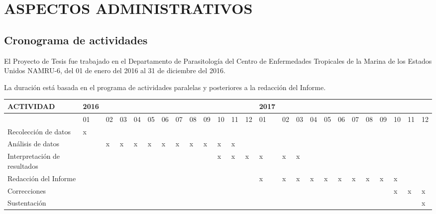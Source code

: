 \documentclass[]{article}
\begin{document}
\section{ASPECTOS ADMINISTRATIVOS}\label{aspectos-administrativos}

\subsection{Cronograma de actividades}\label{cronograma-de-actividades}

El Proyecto de Tesis fue trabajado en el Departamento de Parasitología
del Centro de Enfermedades Tropicales de la Marina de los Estados Unidos
NAMRU-6, del 01 de enero del 2016 al 31 de diciembre del 2016.

La duración está basada en el programa de actividades paralelas y
posteriores a la redacción del Informe.

\begin{table}[ht]
\begin{center}
\hspace*{-1cm}
\begin{tabular}{lp{1mm}p{1mm}p{1mm}p{1mm}p{1mm}p{1mm}
p{1mm}p{1mm}p{1mm}p{1mm}p{1mm}p{1mm}p{1mm}p{1mm}p{1mm}
p{1mm}p{1mm}p{1mm}p{1mm}p{1mm}p{1mm}p{1mm}p{1mm}p{1mm}}
  \hline
  \textbf{ACTIVIDAD} & 
  \textbf{2016} & & & & & & & & & & & & 
  \textbf{2017} & & & & & & & & & & &\\
  \hline
  & 
  01 & 02 & 03 & 04 & 05 & 06 & 07 & 08 & 09 & 10 & 11 & 12 & 
  01 & 02 & 03 & 04 & 05 & 06 & 07 & 08 & 09 & 10 & 11 & 12\\
  \hline
  Recolección de datos & 
  x & & & & & & & & & & & & 
  & & & & & & & & & & &\\
  \cline{2-25}
  Análisis de datos & 
  & x & x & x & x & x & x & x & x & x & x & & 
  & & & & & & & & & & &\\
  \cline{2-25}
  Interpretación de resultados & 
  & & & & & & & & & x & x & x &
  x & x & x & & & & & & & & &\\
  \cline{2-25}
  Redacción del Informe & 
  & & & & & & & & & & & & 
  x & x & x & x & x & x & x & x & x & x & &\\
  \cline{2-25}
  Correcciones & 
  & & & & & & & & & & & & 
  & & & & & & & & & x & x & x\\
  \cline{2-25}
  Sustentación & 
  & & & & & & & & & & & & 
  & & & & & & & & & & & x\\
  \hline
\end{tabular}
\hspace*{-1cm}
\end{center}
        \label{tab:crono}
\end{table}
\end{document}
